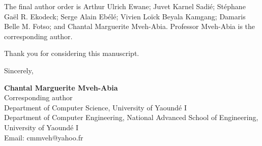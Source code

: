 \documentclass[11pt]{article}
\begin{document}
The final author order is Arthur Ulrich Ewane; Juvet Karnel Sadi\'e; St\'ephane Ga\"el R. Ekodeck; Serge Alain Eb\'el\'e; Vivien Lo\"ick Beyala Kamgang; Damaris Belle M. Fotso; and Chantal Marguerite Mveh-Abia. Professor Mveh-Abia is the corresponding author.

Thank you for considering this manuscript.

Sincerely,

\textbf{Chantal Marguerite Mveh-Abia}\\
Corresponding author\\
Department of Computer Science, University of Yaound\'e I\\
Department of Computer Engineering, National Advanced School of Engineering, University of Yaound\'e I\\
Email: cmmveh@yahoo.fr
\end{document}

